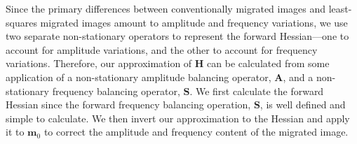     Since the primary differences between conventionally migrated images and least-squares migrated images amount to amplitude and frequency variations, we use two separate non-stationary operators to represent the forward Hessian---one to account for amplitude variations, and the other to account for frequency variations. 
    Therefore, our approximation of $\mathbf{H}$ can be calculated from some application of a non-stationary amplitude balancing operator, $\mathbf{A}$, and a non-stationary frequency balancing operator, $\mathbf{S}$.
    We first calculate the forward Hessian since the forward frequency balancing operation, $\mathbf{S}$, is well defined and simple to calculate. 
    We then invert our approximation to the Hessian and apply it to $\mathbf{m}_0$ to correct the amplitude and frequency content of the migrated image.


